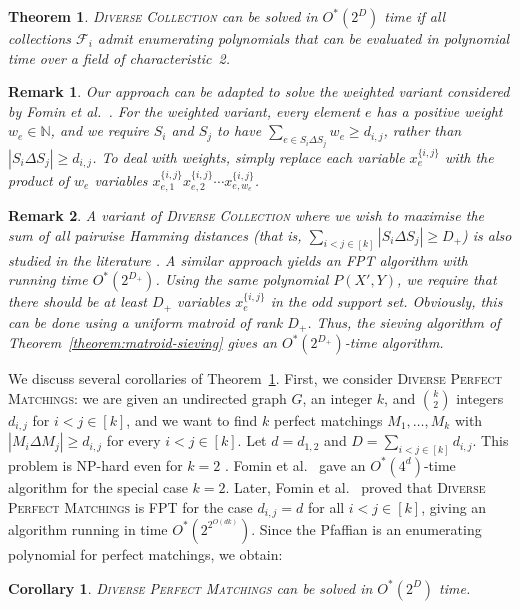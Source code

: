 \documentclass[10pt,a4paper]{article}
\newtheorem{theorem}{Theorem}[section]
\newtheorem{corollary}{Corollary}[section]
\newtheorem{remark}{Remark}[section]
\newcommand{\N}{\ensuremath{\mathbb N}\xspace}
\newcommand{\cF}{\ensuremath{\mathcal F}\xspace}
\begin{document}
\begin{theorem} \label{theorem:diverse-collection}
  \textsc{Diverse Collection} can be solved in $O^*(2^{D})$ time if all collections $\cF_i$ admit enumerating polynomials that can be evaluated in polynomial time over a field of characteristic~2.
\end{theorem}

\begin{remark}
Our approach can be adapted to solve the weighted variant considered by Fomin et al.~\cite{FominGPPS24}.
For the weighted variant, every element $e$ has a positive weight $w_e \in \N$, and we require $S_i$ and $S_j$ to have $\sum_{e \in S_i \Delta S_j} w_e \ge d_{i, j}$, rather than $|S_i \Delta S_j| \ge d_{i, j}$.
To deal with weights, simply replace each variable $x_e^{\{i,j\}}$ with the product of $w_e$ variables $x_{e,1}^{\{i,j\}} x_{e,2}^{\{i,j\}} \cdots x_{e,w_e}^{\{i,j\}}$.
\end{remark}

\begin{remark}
A variant of \textsc{Diverse Collection} where we wish to maximise the sum of all pairwise Hamming distances (that is, $\sum_{i < j \in [k]} |S_i \Delta S_j| \ge D_+$) is also studied in the literature \cite{BasteFJMOPR22,BasteJMPR19,HanakaKKLO22,HanakaKKO21}.
A similar approach yields an FPT algorithm with running time $O^*(2^{D_+})$.
Using the same polynomial $P(X', Y)$, we require that there should be at least $D_+$ variables $x_e^{\{ i, j \}}$ in the odd support set.
Obviously, this can be done using a uniform matroid of rank $D_+$.
Thus, the sieving algorithm of Theorem~\ref{theorem:matroid-sieving} gives an $O^*(2^{D_+})$-time algorithm.
\end{remark}

We discuss several corollaries of Theorem~\ref{theorem:diverse-collection}.
First, we consider \textsc{Diverse Perfect Matchings}:
we are given an undirected graph $G$, an integer $k$, and $\binom{k}{2}$ integers $d_{i,j}$ for $i < j \in [k]$, and we want to find $k$ perfect matchings $M_1, \dots, M_k$ with $|M_i \Delta M_j| \ge d_{i,j}$ for every $i < j \in [k]$.
Let $d = d_{1,2}$ and $D = \sum_{i < j \in [k]} d_{i,j}$.
This problem is NP-hard even for $k = 2$ \cite{Holyer81a}.
Fomin et al.~\cite{FominGJPS24} gave an $O^*(4^{d})$-time algorithm for the special case $k = 2$.
Later, Fomin et al.~\cite{FominGPPS24} proved that \textsc{Diverse Perfect Matchings} is FPT for the case $d_{i,j} = d$ for all $i < j \in [k]$, giving an algorithm running in time $O^*(2^{2^{O(dk)}})$.
Since the Pfaffian is an enumerating polynomial for perfect matchings, we obtain:
\begin{corollary} \label{corollary:diverse-pm}
  \textsc{Diverse Perfect Matchings} can be solved in $O^*(2^{D})$ time.
\end{corollary}
\end{document}
